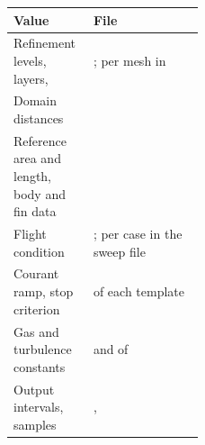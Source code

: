 \begin{tabularx}{\linewidth}{@{}P{0.42\linewidth} L@{}}
\toprule
Value & File \\
\midrule
Refinement levels, layers,  & ; per mesh in  \\
Domain distances &  \\
Reference area and length, body and fin data &  \\
Flight condition & ; per case in the sweep file \\
Courant ramp, stop criterion &  of each template \\
Gas and turbulence constants &  and  of  \\
Output intervals, samples & ,  \\
\bottomrule
\end{tabularx}
